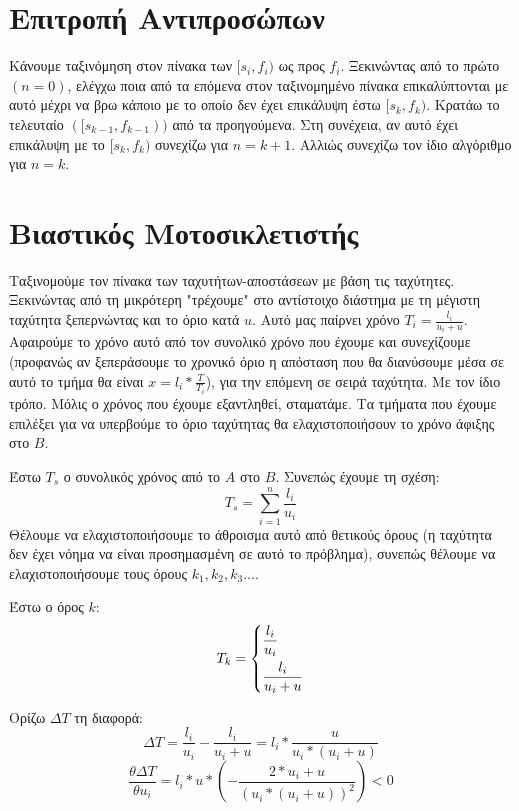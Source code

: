 \documentclass[a4paper,10pt]{article} \usepackage{anysize}
\begin{document}
\def\thesubsection {\alph{subsection}}
\renewcommand{\labelenumi}{\roman{enumi})}
\renewcommand{\labelenumii}{(\arabic{enumii})}




\section{Επιτροπή Αντιπροσώπων} \setcounter{section}{1}
Κάνουμε ταξινόμηση στον πίνακα των $[s_i,f_i)$ ως προς $f_i$. Ξεκινώντας από
 το πρώτο $(n=0)$, ελέγχω ποια από τα επόμενα στον ταξινομημένο πίνακα επικαλύπτονται
με αυτό μέχρι να βρω κάποιο με το οποίο δεν έχει επικάλυψη έστω $[s_k,f_k)$. Κρατάω
το τελευταίο $([s_{k-1},f_{k-1}))$ από τα προηγούμενα. Στη συνέχεια, αν αυτό έχει
επικάλυψη με το $[s_k,f_k)$ συνεχίζω για $n=k+1$. Αλλιώς συνεχίζω
τον ίδιο αλγόριθμο για $n=k$.


\section{Βιαστικός Μοτοσικλετιστής}
Ταξινομούμε τον πίνακα των ταχυτήτων-αποστάσεων με βάση τις ταχύτητες.
Ξεκινώντας από τη μικρότερη "τρέχουμε" στο αντίστοιχο διάστημα με τη μέγιστη
ταχύτητα ξεπερνώντας και το όριο κατά $u$. Αυτό μας παίρνει χρόνο
$T_i=\frac{l_i}{u_i+u}$. Αφαιρούμε το χρόνο αυτό από τον συνολικό χρόνο που
έχουμε και συνεχίζουμε (προφανώς αν ξεπεράσουμε το χρονικό όριο η απόσταση που
θα διανύσουμε μέσα σε αυτό το τμήμα θα είναι $x=l_i*\frac{T}{T_i}$), για την
επόμενη σε σειρά ταχύτητα. Με τον ίδιο τρόπο. Μόλις ο χρόνος που έχουμε
εξαντληθεί, σταματάμε. Τα τμήματα που έχουμε επιλέξει για να υπερβούμε το όριο
ταχύτητας θα ελαχιστοποιήσουν το χρόνο άφιξης στο $B$.

Έστω $T_s$ ο συνολικός χρόνος από το $A$ στο $B$. Συνεπώς έχουμε τη σχέση:
\[
T_s=\sum_{i=1}^n{\frac{l_i}{u_i}}
\]
Θέλουμε να ελαχιστοποιήσουμε το άθροισμα αυτό από θετικούς όρους (η ταχύτητα
δεν έχει νόημα να είναι προσημασμένη σε αυτό το πρόβλημα), συνεπώς θέλουμε να
ελαχιστοποιήσουμε τους όρους $k_1, k_2, k_3 ...$.

Έστω ο όρος $k$:
\[
T_k=
	\begin{dcases}
	\frac{l_i}{u_i} \\
	\frac{l_i}{u_i+u}  
	\end{dcases}
\]

Ορίζω $\Delta{T}$ τη διαφορά:
\[
	\Delta{T}=\frac{l_i}{u_i} - \frac{l_i}{u_i+u} = l_i*\frac{u}{u_i*(u_i+u)}
\] 
\[
	\frac{\theta{\Delta{T}}}{\theta{u_i}} =
	l_i*u*(-\frac{2*u_i+u}{(u_i*(u_i+u))^2}) < 0
\]
\end{document}
